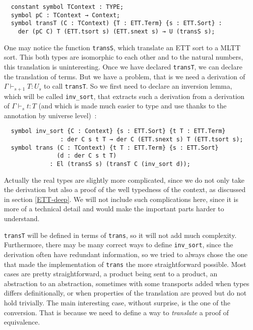 \begin{lstlisting}
  constant symbol TContext : TYPE;
  symbol pC : TContext → Context;
  symbol transT (C : TContext) {T : ETT.Term} {s : ETT.Sort} :
    der (pC C) T (ETT.tsort s) (ETT.snext s) → U (transS s);
\end{lstlisting}

One may notice the function \texttt{transS}, which translate an ETT sort to a
MLTT sort. This both types are isomorphic to each other and to the natural
numbers, this translation is uninteresting. Once we have declared
\texttt{transT}, we can declare the translation of terms. But we have a problem,
that is we need a derivation of $\Gamma\vdash_{s+1} T : U_{s}$ to call \texttt{transT}. So
we first need to declare an inversion lemma, which will be called
\texttt{inv\_sort}, that extracts such a derivation from a derivation of
$\Gamma\vdash_{s} t : T$ (and which is made much easier to type and use thanks to the
annotation by universe level)~:

\begin{lstlisting}
  symbol inv_sort {C : Context} {s : ETT.Sort} {t T : ETT.Term}
                : der C s t T → der C (ETT.snext s) T (ETT.tsort s);
  symbol trans (C : TContext) {t T : ETT.Term} {s : ETT.Sort}
               (d : der C s t T)
             : El (transS s) (transT C (inv_sort d));
\end{lstlisting}

Actually the real types are slightly more complicated, since we do not only take
the derivation but also a proof of the well typedness of the context, as
discussed in section \ref{ETT-deep}. We will not include such complications
here, since it is more of a technical detail and would make the important parts
harder to understand.

\texttt{transT} will be defined in terms of \texttt{trans}, so it will not add
much complexity. Furthermore, there may be many correct ways to define
\texttt{inv\_sort}, since the derivation often have redundant information, so we
tried to always chose the one that made the implementation of \texttt{trans} the
more straightforward possible. Most cases are pretty straightforward, a product
being sent to a product, an abstraction to an abstraction, sometimes with some
transports added when types differs definitionally, or when properties of the
translation are proved but do not hold trivially. The main interesting case,
without surprise, is the one of the conversion. That is because we need to
define a way to \emph{translate} a proof of equivalence.

